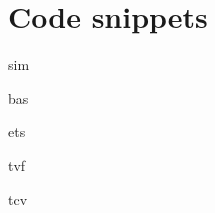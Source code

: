 \chapter{Code snippets}

\makeatletter
\renewcommand{\ALG@name}{Code Snippet}
\makeatother
\begin{algorithm}[H]
	\centering
	{sim}
	\caption{\texttt{Simulator::processTrace}}
	\label{code:sim}
\end{algorithm}

\begin{algorithm}[H]
	\centering
	{bas}
	\caption{\texttt{BaselineController} class}
	\label{code:bas}
\end{algorithm}

\begin{algorithm}[H]
	\centering
	{ets}
	\caption{\texttt{ETMController::setup}}
	\label{code:ets}
\end{algorithm}

\begin{algorithm}[H]
	\centering
	{tvf}
	\caption{\texttt{verify.cpp}'s \texttt{verify} function}
	\label{code:tvf}
\end{algorithm}

\begin{algorithm}[H]
	\centering
	{tcv}
	\caption{\texttt{verify.cpp}'s \texttt{crossVerify} function}
	\label{code:tcv}
\end{algorithm}
